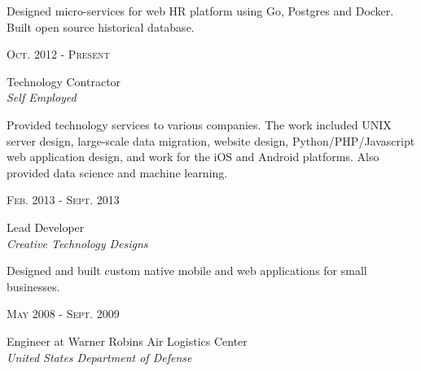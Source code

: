 \documentclass[10pt]{article} %
\begin{document}
{\begin{minipage}[t]{0.5\textwidth}
\small{Designed micro-services for web HR platform using Go, Postgres and Docker. Built open source historical database.}\\


{\raggedleft\textsc{Oct. 2012 - Present}\par}
{\raggedright\large Technology Contractor\\
\textit{Self Employed}\\[5pt]}

\small{Provided technology services to various companies. The work included UNIX server design, large-scale data migration, website design, Python/PHP/Javascript web application design, and work for the iOS and Android platforms. Also provided data science and machine learning.}\\


{\raggedleft\textsc{Feb. 2013 - Sept. 2013}\par}
{\raggedright\large Lead Developer\\
\textit{Creative Technology Designs}\\[5pt]}


\small{Designed and built custom native mobile and web applications for small businesses.}\\


{\raggedleft\textsc{May 2008 - Sept. 2009}\par}

{\raggedright\large Engineer at Warner Robins Air Logistics Center\\
\textit{United States Department of Defense}\\[5pt]}


\end{minipage}}
\end{document}
